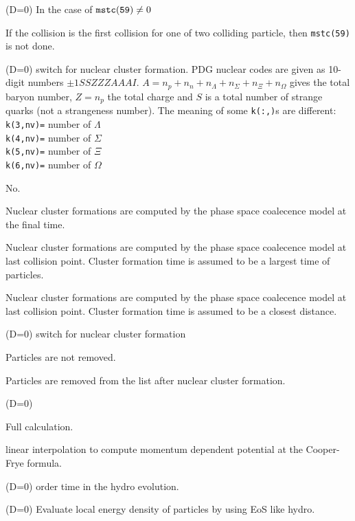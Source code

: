 \documentclass[]{article}
\newenvironment{entry}%
{\begin{list}{}{\setlength{\topsep}{0mm} \setlength{\itemsep}{0mm}
\setlength{\parskip}{0mm} \setlength{\parsep}{0mm}
\setlength{\leftmargin}{20mm} \setlength{\rightmargin}{0mm}
\setlength{\labelwidth}{18mm} \setlength{\labelsep}{2mm}}}%
{\end{list}}
\newenvironment{subentry}%
{\begin{list}{}{\setlength{\topsep}{0mm} \setlength{\itemsep}{0mm}
\setlength{\parskip}{0mm} \setlength{\parsep}{0mm}
\setlength{\leftmargin}{10mm} \setlength{\rightmargin}{0mm}
\setlength{\labelwidth}{18mm} \setlength{\labelsep}{2mm}}}%
{\end{list}}
\newcommand{\ttt}[1]{{\tt#1}}
\newcommand{\itemt}[1]{\item[{\tt #1}\hfill]}
\begin{document}
\begin{entry}
\itemt{mstc(130) :}(D=0) In the case of ${\tt mstc(59)}\ne0$
 \begin{subentry}
    \itemt{$=1$ :} If the collision is the first collision for
            one of two colliding particle, then {\tt mstc(59)} is not
	    done.
 \end{subentry}

\itemt{mstc(131) :}(D=0) switch for nuclear cluster formation.
PDG nuclear codes are given as 10-digit numbers $\pm1SSZZZAAAI$.
$A = n_p + n_n + n_\Lambda + n_\Sigma + n_\Xi + n_\Omega$ gives the total baryon number,
$Z = n_p$ the total charge and
$S$ is a total number of strange quarks (not a strangeness number).
The meaning of some \ttt{k(:,)}s are different:\\
\ttt{k(3,nv)=} number of $\Lambda$\\
\ttt{k(4,nv)=} number of $\Sigma$\\
\ttt{k(5,nv)=} number of $\Xi$\\
\ttt{k(6,nv)=} number of $\Omega$

 \begin{subentry}
    \itemt{$=0$ :} No.
    \itemt{$=1$ :} Nuclear cluster formations are computed by the
    phase space coalecence model at the final time.
    \itemt{$=2$ :} Nuclear cluster formations are computed by the
    phase space coalecence model at last collision point.
    Cluster formation time is assumed to be a largest time of particles.
    \itemt{$=3$ :} Nuclear cluster formations are computed by the
    phase space coalecence model at last collision point.
    Cluster formation time is assumed to be a closest distance.
 \end{subentry}

\itemt{mstc(132) :}(D=0) switch for nuclear cluster formation
 \begin{subentry}
    \itemt{$=0$ :} Particles are not removed.
    \itemt{$=1$ :} Particles are removed from the list after nuclear cluster formation.
 \end{subentry}

\itemt{mstc(135) :}(D=0) 
 \begin{subentry}
    \itemt{$=0$ :} Full calculation.
    \itemt{$=1$ :} linear interpolation to compute momentum dependent
potential at the Cooper-Frye formula.
 \end{subentry}


\itemt{mstc(136) :}(D=0) order time in the  hydro evolution.

\itemt{mstc(137) :}(D=0) Evaluate local energy density of particles
by using EoS like hydro.


\end{entry}
\end{document}
